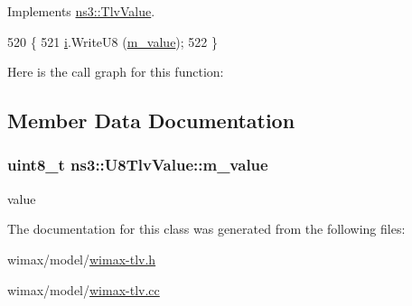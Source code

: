Implements \hyperlink{classns3_1_1TlvValue_aeec8825728398e18337efd9cb40a2aa4}{ns3\+::\+Tlv\+Value}.


\begin{DoxyCode}
520 \{
521   \hyperlink{bernuolliDistribution_8m_a6f6ccfcf58b31cb6412107d9d5281426}{i}.WriteU8 (\hyperlink{classns3_1_1U8TlvValue_abe2c2ee1bd2b6808d2b5b895495e371f}{m\_value});
522 \}
\end{DoxyCode}


Here is the call graph for this function\+:




\subsection{Member Data Documentation}
\subsubsection[{\texorpdfstring{m\+\_\+value}{m_value}}]{\setlength{\rightskip}{0pt plus 5cm}uint8\+\_\+t ns3\+::\+U8\+Tlv\+Value\+::m\+\_\+value\hspace{0.3cm}{\ttfamily [private]}}\hypertarget{classns3_1_1U8TlvValue_abe2c2ee1bd2b6808d2b5b895495e371f}{}\label{classns3_1_1U8TlvValue_abe2c2ee1bd2b6808d2b5b895495e371f}


value 



The documentation for this class was generated from the following files\+:\begin{DoxyCompactItemize}
\item 
wimax/model/\hyperlink{wimax-tlv_8h}{wimax-\/tlv.\+h}\item 
wimax/model/\hyperlink{wimax-tlv_8cc}{wimax-\/tlv.\+cc}\end{DoxyCompactItemize}
